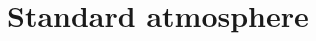 \hypertarget{group___standard_atmosphere}{}\section{Standard atmosphere}
\label{group___standard_atmosphere}
